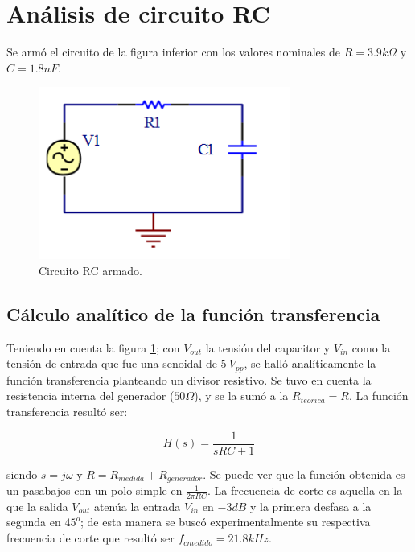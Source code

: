 



\onehalfspacing



\section{Análisis de circuito RC}

Se armó el circuito de la figura inferior con los valores nominales de $R=3.9k\Omega$ y $C=1.8nF$.
\begin{figure}[h!]
\centering
\includegraphics[scale=0.5]{rcCircuito.png}
\caption{Circuito RC armado.}
\label{fig:RC}
\end{figure}

\subsection{Cálculo analítico de la función transferencia}\label{sec:fc}

Teniendo en cuenta la figura \ref{fig:RC}; con $V_{out}$ la tensión del capacitor y $V_{in}$ como la tensión de entrada que fue una senoidal de $5~V_{pp}$, se halló analíticamente la función transferencia planteando un divisor resistivo. Se tuvo en cuenta la resistencia interna
del generador ($50\Omega$), y se la sumó a la $R_{teorica}=R$.
La función transferencia resultó ser:

\begin{center}
\begin{equation}
\label{eq:transf}
H(s)=\frac{1}{sRC+1}
\end{equation}
\end{center}

siendo $s=j\omega$ y $R=R_{medida} + R_{generador}$.
Se puede ver que la función obtenida es un pasabajos con un polo simple en $\frac{1}{2\pi RC}$.
La frecuencia de corte es aquella en la que la salida $V_{out}$ atenúa la entrada $V_{in}$ en $-3dB$ y la primera desfasa a la segunda en $45^o$; de esta manera se buscó experimentalmente su respectiva frecuencia de corte que resultó ser $f_{cmedido}=21.8kHz$.

